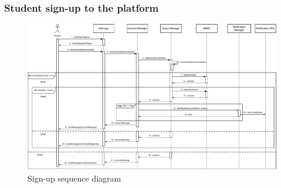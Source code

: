 \documentclass{article}
\begin{document}
{\begin{itemize}
    \subsubsection{Student sign-up to the platform}
        \begin{figure}[H]
            \centering
            \hspace*{-3.7cm}\includegraphics[scale=0.65]{Sequence/Sequence1DD.pdf}
            \caption{Sign-up sequence diagram}
            \label{fig:Sequence1DD}
        \end{figure}


\end{itemize}}
\end{document}
